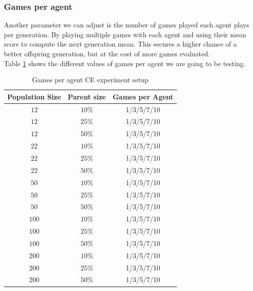 \subsubsection{Games per agent \label{GamesPerAgentCESection}}

Another parameter we can adjust is the number of 
games played each agent plays per generation. By playing
multiple games with each agent and using their 
mean score to compute the next generation mean. This
secures a higher chance of a better offspring generation,
but at the cost of more games
evaluated.\\
Table \ref{GamesPerAgentCE} shows the different values of
games per agent we are going to be
testing.

\begin{table}[H]
\centering
\begin{tabular}{c c c}
Population Size & Parent size & Games per Agent\\
\hline
$12$ & $10\%$ & 1/3/5/7/10\\
$12$ & $25\%$ & 1/3/5/7/10\\
$12$ & $50\%$ & 1/3/5/7/10\\
$22$ & $10\%$ & 1/3/5/7/10\\
$22$ & $25\%$ & 1/3/5/7/10\\
$22$ & $50\%$ & 1/3/5/7/10\\
$50$ & $10\%$ & 1/3/5/7/10\\
$50$ & $25\%$ & 1/3/5/7/10\\
$50$ & $50\%$ & 1/3/5/7/10\\
$100$ & $10\%$  & 1/3/5/7/10\\
$100$ & $25\%$  & 1/3/5/7/10\\
$100$ & $50\%$ & 1/3/5/7/10\\
$200$ & $10\%$ & 1/3/5/7/10\\
$200$ & $25\%$ & 1/3/5/7/10\\
$200$ & $50\%$ & 1/3/5/7/10
\end{tabular}
\caption{Games per agent CE experiment setup\label{GamesPerAgentCE}}
\end{table}

